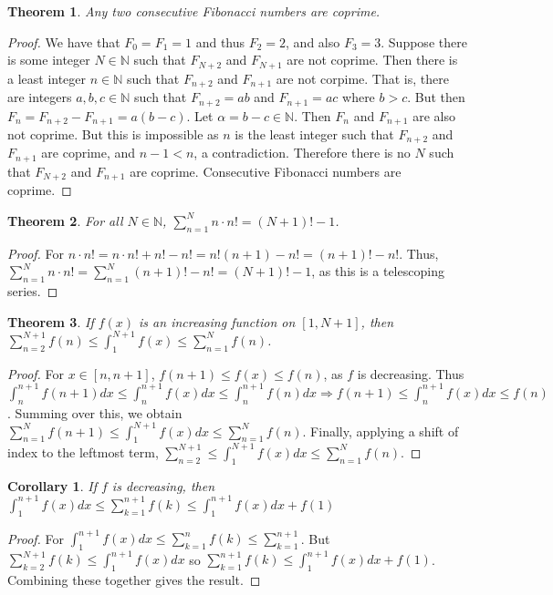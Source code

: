 \documentclass[12pt,oneside]{book}
\theoremstyle{mystyle}
\newtheorem{theorem}{Theorem}[section]
\newtheorem{corollary}{Corollary}[section]
\begin{document}
\begin{theorem}
Any two consecutive Fibonacci numbers are coprime.
\end{theorem}
\begin{proof}
We have that $F_0=F_1 = 1$ and thus $F_2 = 2$, and also $F_3 = 3$. Suppose there is some integer $N\in \mathbb{N}$ such that $F_{N+2}$ and $F_{N+1}$ are not coprime. Then there is a least integer $n\in \mathbb{N}$ such that $F_{n+2}$ and $F_{n+1}$ are not corpime. That is, there are integers $a,b,c\in \mathbb{N}$ such that $F_{n+2} = ab$ and $F_{n+1} = ac$ where $b>c$. But then $F_{n} = F_{n+2} - F_{n+1} = a(b-c)$. Let $\alpha = b-c \in \mathbb{N}$. Then $F_n$ and $F_{n+1}$ are also not coprime. But this is impossible as $n$ is the least integer such that $F_{n+2}$ and $F_{n+1}$ are coprime, and $n-1<n$, a contradiction. Therefore there is no $N$ such that $F_{N+2}$ and $F_{n+1}$ are coprime. Consecutive Fibonacci numbers are coprime. 
\end{proof}

\begin{theorem}
For all $N\in \mathbb{N}$, $\sum_{n=1}^{N} n\cdot n! = (N+1)!-1$.
\end{theorem}
\begin{proof}
For $n\cdot n! = n\cdot n! + n! - n! = n!(n+1) - n!=(n+1)!-n!$. Thus, $\sum_{n=1}^{N} n\cdot n! = \sum_{n=1}^{N} (n+1)! -n! = (N+1)!-1$, as this is a telescoping series.
\end{proof}

\begin{theorem}
If $f(x)$ is an increasing function on $[1,N+1]$, then $\sum_{n=2}^{N+1} f(n) \leq \int_{1}^{N+1} f(x) \leq \sum_{n=1}^{N} f(n)$.
\end{theorem}
\begin{proof}
For $x\in [n,n+1]$, $f(n+1)\leq f(x)\leq f(n)$, as $f$ is decreasing. Thus $\int_{n}^{n+1} f(n+1)dx \leq \int_{n}^{n+1} f(x) dx \leq \int_{n}^{n+1} f(n)dx \Rightarrow f(n+1) \leq \int_{n}^{n+1}f(x)dx \leq f(n)$. Summing over this, we obtain $\sum_{n=1}^{N} f(n+1) \leq \int_{1}^{N+1} f(x) dx \leq \sum_{n=1}^{N} f(n)$. Finally, applying a shift of index to the leftmost term, $\sum_{n=2}^{N+1} \leq \int_{1}^{N+1}f(x)dx \leq \sum_{n=1}^{N} f(n)$. 
\end{proof}

\begin{corollary}
If $f$ is decreasing, then $\int_{1}^{n+1} f(x)dx \leq \sum_{k=1}^{n+1} f(k) \leq \int_{1}^{n+1} f(x)dx + f(1)$
\end{corollary}
\begin{proof}
For $\int_{1}^{n+1}f(x) dx \leq \sum_{k=1}^{n}f(k)\leq \sum_{k=1}^{n+1}$. But $\sum_{k=2}^{N+1} f(k) \leq \int_{1}^{n+1}f(x)dx$ so $\sum_{k=1}^{n+1}f(k) \leq \int_{1}^{n+1}f(x)dx +f(1)$. Combining these together gives the result.
\end{proof}
\end{document}
